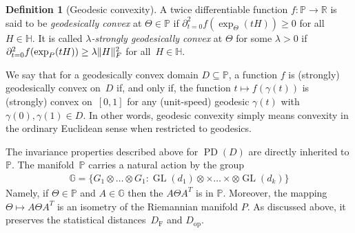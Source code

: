 \documentclass[aos]{imsart}
\theoremstyle{definition}
\newtheorem*{definition}{Definition}
\numberwithin{equation}{section}
\DeclareMathOperator{\GL}{GL}
\DeclareMathOperator{\PD}{PD}
\DeclarePairedDelimiter{\norm}{\lVert}{\rVert}
\newcommand{\R}{{\mathbb{R}}}
\renewcommand{\P}{{\mathbb{P}}}
\renewcommand{\H}{{\mathbb{H}}}
\newcommand{\G}{{\mathbb{G}}}
\newcommand{\ot}{\otimes}
\newcommand{\samp}{x}
\newcommand{\DF}{D_{\operatorname{F}}}
\newcommand{\Dop}{D_{\operatorname{op}}}
\newcommand{\MW}[1]{{\color{red}[MW: #1]}}
\newcommand{\MW}[1]{{}}
\begin{document}
\begin{definition}[Geodesic convexity]
A twice differentiable function $f\colon \P \to \R$ is said to be \emph{geodesically convex} at $\Theta\in\P$ if $\partial^2_{t=0} f(\exp_\Theta(tH)) \geq 0$ for all~$H\in\H$.
It is called \emph{$\lambda$-strongly geodesically convex} at $\Theta$ for some $\lambda>0$ if $\partial^2_{t=0} f(\exp_P(tH)) \geq \lambda \norm H_F^2$ for all~$H\in\H$.

We say that for a geodesically convex domain $D \subseteq \P$, a function $f$ is (strongly) geodesically convex on~$D$ if, and only if, the function $t \mapsto f(\gamma(t))$ is (strongly) convex on~$[0,1]$ for any (unit-speed) geodesic $\gamma(t)$ with $\gamma(0),\gamma(1)\in D$.
In other words, geodesic convexity simply means convexity in the ordinary Euclidean sense when restricted to geodesics.

\end{definition}

The invariance properties described above for $\PD(D)$ are directly inherited to $\P$.
The manifold~$\P$ carries a natural action by the group
\begin{align*}
  \G =  \{G_1 \ot \dots \ot G_1: \GL(d_1)\ot \times \dots \times \ot \GL(d_k)\}
\end{align*}
Namely, if $\Theta \in \P$ and $A \in \G$ then the $A \Theta A^T$ is in $\P$.
Moreover, the mapping $\Theta \mapsto A\Theta A^T$ is an isometry of the Riemannian manifold $P$.
As discussed above, it preserves the statistical distances~$\DF$ and $\Dop$.

\end{document}
